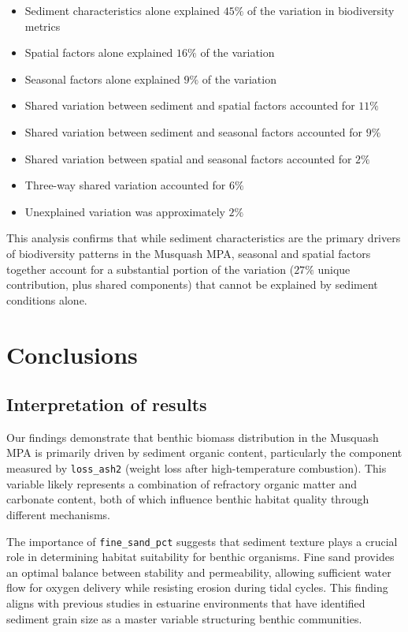 \documentclass[12pt]{article}
\begin{document}
\begin{itemize}

    \item Sediment characteristics alone explained $45\%$ of the variation in biodiversity metrics
    \item Spatial factors alone explained $16\%$ of the variation
    \item Seasonal factors alone explained $9\%$ of the variation
    \item Shared variation between sediment and spatial factors accounted for $11\%$
    \item Shared variation between sediment and seasonal factors accounted for $9\%$
    \item Shared variation between spatial and seasonal factors accounted for $2\%$
    \item Three-way shared variation accounted for $6\%$
    \item Unexplained variation was approximately $2\%$
\end{itemize}

This analysis confirms that while sediment characteristics are the primary drivers of biodiversity patterns in the Musquash MPA, seasonal and spatial factors together account for a substantial portion of the variation ($27\%$ unique contribution, plus shared components) that cannot be explained by sediment conditions alone.


\newpage
\section{Conclusions}
\subsection{Interpretation of results}

\qquad Our findings demonstrate that benthic biomass distribution in the
Musquash MPA is primarily driven by sediment organic content, particularly the
component measured by \texttt{loss\_ash2} (weight loss after high-temperature
combustion). This variable likely represents a combination of refractory organic
matter and carbonate content, both of which influence benthic habitat quality
through different mechanisms.

\qquad The importance of \texttt{fine\_sand\_pct} suggests that sediment texture
plays a crucial role in determining habitat suitability for benthic organisms.
Fine sand provides an optimal balance between stability and permeability,
allowing sufficient water flow for oxygen delivery while resisting erosion
during tidal cycles. This finding aligns with previous studies in estuarine
environments that have identified sediment grain size as a master variable
structuring benthic communities\cite{glud2008oxygen}.
\end{document}

